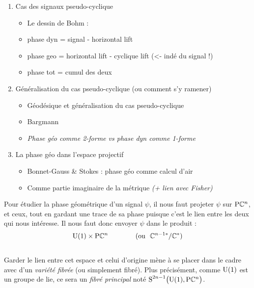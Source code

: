 \begin{enumerate}[label=\arabic{enumi}.\arabic* --- ]
	
	\item Cas des signaux pseudo-cyclique
	\begin{itemize} \normalfont
		
		\item Le dessin de Bohm :
		
		\item phase dyn =  signal - horizontal lift
		
		\item phase geo = horizontal lift - cyclique lift (<- indé du signal !)
		
		\item phase tot = cumul des deux
	\end{itemize}
	
	\item Généralisation du cas pseudo-cyclique (ou comment s'y ramener)
	\begin{itemize} \normalfont
		
		\item Géodésique et généralisation du cas pseudo-cyclique
		
		\item Bargmann 
		
		\item \textit{Phase géo comme 2-forme vs phase dyn comme 1-forme}
	\end{itemize}
	
	\item La phase géo dans l'espace projectif
	\begin{itemize} \normalfont
		
		\item Bonnet-Gauss  \& Stokes : phase géo comme calcul d'air
		
		\item Comme partie imaginaire de la métrique \textit{(+ lien avec Fisher)}
		
	\end{itemize}
\end{enumerate}




Pour étudier la phase géométrique d'un signal $\psi$, il nous faut projeter $\psi$ sur $\text{\normalfont P}\mathbb{C}^{n}$, et ceux, tout en gardant une trace de sa phase puisque c'est le lien entre les deux qui nous intéresse. Il nous faut donc envoyer $\psi$ dans le produit :
\[\text{\normalfont U}(1)\times \text{\normalfont P}\mathbb{C}^{n}\qquad\qquad (\text{ou }\ \mathbb{C}^{n-1*}/\mathbb{C}^*)\]
\\
Garder le lien entre cet espace et celui d'origine mène à se placer dans le cadre avec d'un \emph{variété fibrée} (ou simplement fibré). Plus précisément, comme $\text{\normalfont U}(1)$ est un groupe de lie, ce sera un \emph{fibré principal} noté $\text{\normalfont S}^{2n-1}\big(\text{\normalfont U}(1),\text{\normalfont P}\mathbb{C}^{n}\big)$.
\\

